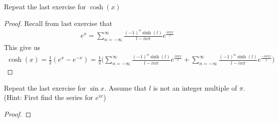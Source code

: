 \documentclass{report}
\begin{document}
\begin{question}{}{}
Repeat the last exercise for $\cosh (x)$
\end{question}
\begin{proof}
Recall from last exercise that 
\begin{align*}
e^x= \sum_{n=- \infty}^{\infty} \frac{(-1)^n \sinh (l)}{l-i n \pi }  e^{ \frac{i n \pi  x}{l}}
\end{align*}
This give us 
\begin{align*}
\cosh (x) =\frac{1}{2}(e^{x}-e^{-x})= \frac{1}{2}\Big( \sum_{n=-\infty}^{\infty} \frac{(-1)^n \sinh (l)}{l- i n \pi }e^{ \frac{i n \pi  x}{l}}+ \sum_{n=-\infty}^{\infty} \frac{(-1)^n \sinh (l)}{l- i n \pi }e^{\frac{-i n \pi  x}{l}} \Big)
\end{align*}
\end{proof}
\begin{question}{}{}
Repeat the last exercise for $\sin x$. Assume that $l$ is not an integer multiple of  $\pi $. (Hint: First find the series for $e^{ ix}$)
\end{question}
\begin{proof}

\end{proof}
\end{document}
